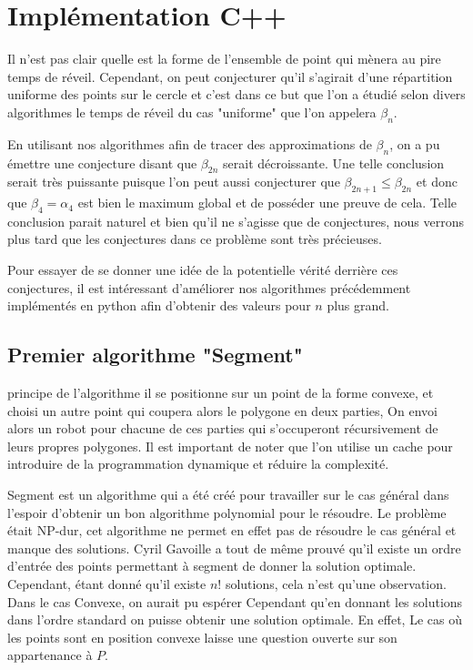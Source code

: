 \section{Implémentation C++}

Il n'est pas clair quelle est la forme de l'ensemble de point qui mènera au pire temps de réveil. Cependant, on peut conjecturer qu'il s'agirait d'une répartition uniforme des points sur le cercle et c'est dans ce but que l'on a étudié selon divers algorithmes le temps de réveil du cas "uniforme" que l'on appelera $\beta_n$.

En utilisant nos algorithmes afin de tracer des approximations de $\beta_n$, on a pu émettre une conjecture disant que $\beta_{2n}$ serait décroissante. Une telle conclusion serait très puissante puisque l'on peut aussi conjecturer que $\beta_{2n + 1} \leq \beta_{2n}$ et donc que $\beta_4 = \alpha_4$ est bien le maximum global et de posséder une preuve de cela.
Telle conclusion parait naturel et bien qu'il ne s'agisse que de conjectures, nous verrons plus tard que les conjectures dans ce problème sont très précieuses.

Pour essayer de se donner une idée de la potentielle vérité derrière ces conjectures, il est intéressant d'améliorer nos algorithmes précédemment implémentés en python afin d'obtenir des valeurs pour $n$ plus grand.

\subsection{Premier algorithme "Segment"}

\large{principe de l'algorithme} il se positionne sur un point de la forme convexe, et choisi un autre point qui coupera alors le polygone en deux parties, On envoi alors un robot pour chacune de ces parties qui s'occuperont récursivement de leurs propres polygones.
Il est important de noter que l'on utilise un cache pour introduire de la programmation dynamique et réduire la complexité.

Segment est un algorithme qui a été créé pour travailler sur le cas général dans l'espoir d'obtenir un bon algorithme polynomial pour le résoudre. Le problème était NP-dur, cet algorithme ne permet en effet pas de résoudre le cas général et manque des solutions. Cyril Gavoille a tout de même prouvé qu'il existe un ordre d'entrée des points permettant à segment de donner la solution optimale. Cependant, étant donné qu'il existe $n!$ solutions, cela n'est qu'une observation.
Dans le cas Convexe, on aurait pu espérer Cependant qu'en donnant les solutions dans l'ordre standard on puisse obtenir une solution optimale. En effet, Le cas où les points sont en position convexe laisse une question ouverte sur son appartenance à $P$. 

